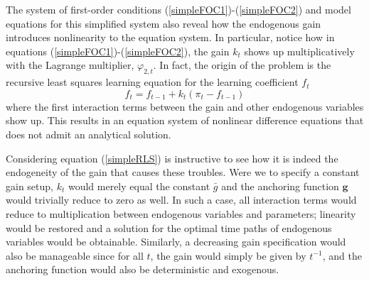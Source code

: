 \documentclass[11pt]{article}
\renewcommand{\[}{\begin{equation}}
\renewcommand{\]}{\end{equation}}
\begin{document}
The system of first-order conditions (\ref{simpleFOC1})-(\ref{simpleFOC2}) and model equations for this simplified system also reveal how the endogenous gain introduces nonlinearity to the equation system. In particular, notice how in equations (\ref{simpleFOC1})-(\ref{simpleFOC2}), the gain $k_t$ shows up multiplicatively with the Lagrange multiplier, $\varphi_{2,t}$. In fact, the origin of the problem is the recursive least squares learning equation for the learning coefficient $f_t$
\begin{equation}
f_t = f_{t-1} + k_t(\pi_t - f_{t-1}) \label{simpleRLS}
\end{equation}
where the first interaction terms between the gain and other endogenous variables show up. This results in an equation system of nonlinear difference equations that does not admit an analytical solution. 

Considering equation (\ref{simpleRLS}) is instructive to see how it is indeed the endogeneity of the gain that causes these troubles. Were we to specify a constant gain setup, $k_t$ would merely equal the constant $\bar{g}$ and the anchoring function $\mathbf{g}$ would trivially reduce to zero as well. In such a case, all interaction terms would reduce to multiplication between endogenous variables and parameters; linearity would be restored and a solution for the optimal time paths of endogenous variables would be obtainable. Similarly, a decreasing gain specification would also be manageable since for all $t$, the gain would simply be given by $t^{-1}$, and the anchoring function would also be deterministic and exogenous. 
\end{document}
